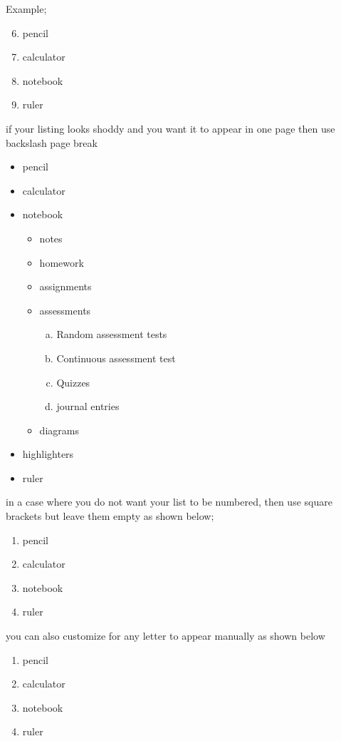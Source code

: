 \documentclass[a4paper,12pt]{article}
\begin{document}
  	 Example;
  	 \begin {enumerate}\setcounter{enumi}{5}
  	 \item pencil
  	 \item calculator
  	 \item notebook
  	 \item ruler
  	 \end{enumerate}
  	 if your listing looks shoddy and you want it to appear in one page then use backslash page break
  	 \pagebreak
  	\begin{itemize}
  		\item pencil
  		\item calculator
  		\item notebook
  		\begin{itemize}
  			\item notes
  			\item homework
  			\item assignments
  			\item assessments
  			\begin{enumerate}[a.]
  				\item Random assessment tests
  				\item Continuous assessment test
  				\item Quizzes
  				\item journal entries
  				
  				
  			\end{enumerate}
  			\item diagrams
  		\end{itemize}
  		\item highlighters
  		\item ruler
  	\end{itemize}
  	
  	in a case where you do not want your list to be numbered, then use square brackets but leave them empty as shown below;
  	
  	\begin {enumerate}[]
  	\item pencil
  	\item calculator
  	\item notebook
  	\item ruler
  	\end{enumerate}
  	
  	you can also customize for any letter to appear manually as shown below
  	\vspace{0.1cm}
  	\begin {enumerate}
  	\item[one.] pencil
  	\item[a.] calculator
  	\item[23.] notebook
  	\item ruler
  	\end{enumerate}
  	
  	
\end{document}
